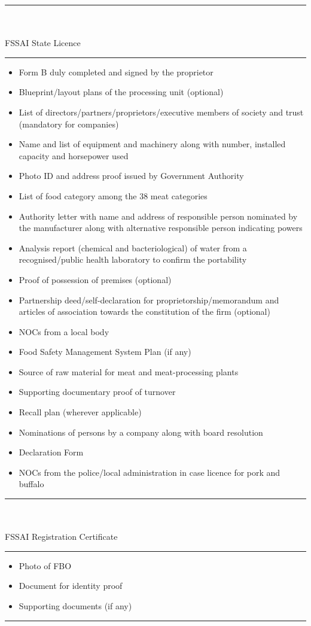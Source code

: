 \documentclass[a4paper, 12pt]{article}
\begin{document}
 \noindent\rule{16cm}{0.4pt}\\
	\\
FSSAI State Licence\\
\noindent\rule{16cm}{0.4pt}
\begin{itemize}[noitemsep]
\item Form B duly completed and signed by the proprietor
\item Blueprint/layout plans of the processing unit (optional) 
\item List of directors/partners/proprietors/executive members of society and trust (mandatory for companies) 
\item Name and list of equipment and machinery along with number, installed capacity and horsepower used 
\item Photo ID and address proof issued by Government Authority 
\item List of food category among the 38 meat categories 
\item Authority letter with name and address of responsible person nominated by the manufacturer along with alternative responsible person indicating powers   
\item Analysis report (chemical and bacteriological) of water from a recognised/public health laboratory to confirm the portability 
\item Proof of possession of premises (optional) 
\item Partnership deed/self-declaration for proprietorship/memorandum and articles of association towards the constitution of the firm (optional) 
\item NOCs from a local body 
\item Food Safety Management System Plan (if any) 
\item Source of raw material for meat and meat-processing plants 
\item Supporting documentary proof of turnover 
\item Recall plan (wherever applicable) 
\item Nominations of persons by a company along with board resolution 
\item Declaration Form 
\item NOCs from the police/local administration in case licence for pork and buffalo  
\end{itemize}

\noindent\rule{16cm}{0.4pt}\\
	\\
FSSAI Registration Certificate\\
\noindent\rule{16cm}{0.4pt}
\begin{itemize}[noitemsep]
\item Photo of FBO \\
\item Document for identity proof \\
\item Supporting documents (if any) \\
\end{itemize}
\noindent\rule{16cm}{0.4pt}\\
\newpage
\end{document}
